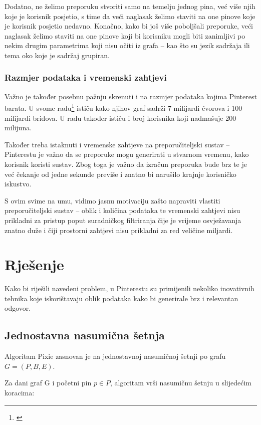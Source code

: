 \documentclass[times, utf8, seminar]{fer}
\begin{document}
Dodatno, ne želimo preporuku stvoriti samo na temelju jednog pina, već više njih koje je korisnik posjetio, s time da veći naglasak želimo staviti na one pinove koje je korisnik posjetio nedavno. Konačno, kako bi još više poboljšali preporuke, veći naglasak želimo staviti na one pinove koji bi korisniku mogli biti zanimljivi po nekim drugim parametrima koji nisu očiti iz grafa -- kao što su jezik sadržaja ili tema oko koje je sadržaj grupiran.

\subsection{Razmjer podataka i vremenski zahtjevi}

Važno je također posebnu pažnju skrenuti i na razmjer podataka kojima Pinterest barata. U svome radu\footnote{\cite{DBLP:journals/corr/abs-1711-07601}} ističu kako njihov graf sadrži 7 milijardi čvorova i 100 milijardi bridova. U radu također ističu i broj korisnika koji nadmašuje 200 milijuna.

Također treba istaknuti i vremenske zahtjeve na preporučiteljski sustav -- Pinterestu je važno da se preporuke mogu generirati u stvarnom vremenu, kako korisnik koristi sustav. Zbog toga je važno da izračun preporuka bude brz te je već čekanje od jedne sekunde previše i znatno bi narušilo krajnje korisničko iskustvo.

S ovim svime na umu, vidimo jasnu motivaciju zašto napraviti vlastiti preporučiteljski sustav -- oblik i količina podataka te vremenski zahtjevi nisu prikladni za pristup poput suradničkog filtriranja čije je vrijeme osvježavanja znatno duže i čiji prostorni zahtjevi nisu prikladni za red veličine miljardi.

\chapter{Rješenje}

Kako bi riješili navedeni problem, u Pinterestu su primijenili nekoliko inovativnih tehnika koje iskorištavaju oblik podataka kako bi generirale brz i relevantan odgovor.

\section{Jednostavna nasumična šetnja}

Algoritam Pixie zasnovan je na jednostavnoj nasumičnoj šetnji po grafu $G = (P, B, E) $.

Za dani graf G i početni pin $p \in P$, algoritam vrši nasumičnu šetnju u slijedećim koracima:
\end{document}
